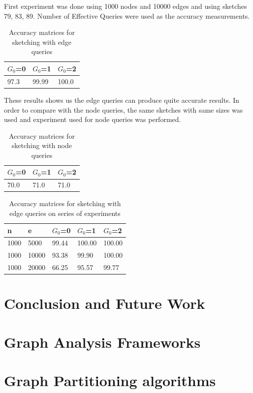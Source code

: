 \documentclass[12pt]{report}
\numberwithin{figure}{section}
\numberwithin{table}{section}
\begin{document}
First experiment was done using 1000 nodes and 10000 edges and using sketches 79, 83, 89. Number of Effective Queries were used as the accuracy measurements.

\begin{table}[H]
\centering
\begin{tabular}{|l|l|l|}
\hline
$G_0$=0 & $G_0$=1 & $G_0$=2 \\ \hline
97.3  &   99.99  &   100.0\\ \hline
\end{tabular}
\caption{Accuracy matrices for sketching with edge queries}
\end{table}

These results shows us the edge queries can produce quite accurate results. In order to compare with the node queries, the same sketches with same sizes was used and experiment used for node queries was performed. 

\begin{table}[H]
\centering
\begin{tabular}{|l|l|l|}
\hline
$G_0$=0 & $G_0$=1 & $G_0$=2 \\ \hline
70.0  &   71.0  &   71.0\\ \hline
\end{tabular}
\caption{Accuracy matrices for sketching with node queries}
\end{table}

\begin{table}[H]
\centering
\begin{tabular}{|l|l|l|l|l|}
\hline
n    & e     & $G_0$=0 & $G_0$=1 & $G_0$=2 \\ \hline
1000 & 5000  & 99.44   & 100.00  & 100.00  \\ \hline
1000 & 10000 & 93.38   & 99.90   & 100.00  \\ \hline
1000 & 20000 & 66.25   & 95.57   & 99.77   \\ \hline
\end{tabular}
\caption{Accuracy matrices for sketching with edge queries on series of experiments}
\label{my-label}
\end{table}


\chapter{Conclusion and Future Work }


\newpage
\begin{appendices}


\chapter{Graph Analysis Frameworks}



\chapter{Graph Partitioning algorithms}




\end{appendices}
\end{document}
